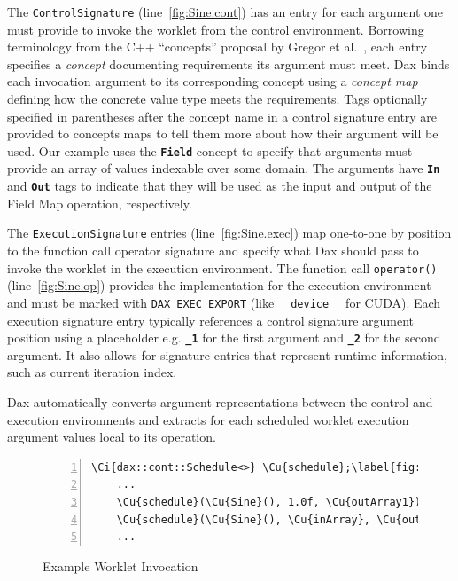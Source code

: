 \documentclass[conference]{IEEEtran}
\newcommand*{\scite}[1]{~\cite{#1}}
\newcommand{\etal}{et al.}
\newcommand{\Ci}[1]{{\textbf{#1}}} %
\newcommand{\Cu}[1]{{\color{gray}\textbf{#1}}} %
\newcommand{\Code}[1]{{\small\texttt{#1}}}
\begin{document}
The \Code{ControlSignature} (line~\ref{fig:Sine.cont}) has an entry
for each argument one must provide to invoke the worklet from the
control environment.
%
Borrowing terminology from the C++ ``concepts'' proposal by Gregor
\etal\scite{Gregor2006}, each entry specifies a \emph{concept}
documenting requirements its argument must meet.
%
Dax binds each invocation argument to its corresponding concept using
a \emph{concept map} defining how the concrete value type meets the
requirements.
%
Tags optionally specified in parentheses after the concept name in a
control signature entry are provided to concepts maps to tell them
more about how their argument will be used.
%
Our example uses the \Code{\Ci{Field}} concept to specify that
arguments must provide an array of values indexable over some domain.
%
The arguments have \Code{\Ci{In}} and \Code{\Ci{Out}} tags to indicate
that they will be used as the input and output of the Field Map
operation, respectively.

The \Code{ExecutionSignature} entries (line~\ref{fig:Sine.exec}) map
one-to-one by position to the function call operator signature and
specify what Dax should pass to invoke the worklet in the execution
environment.
%
The function call \Code{operator()} (line~\ref{fig:Sine.op}) provides
the implementation for the execution environment and must be marked
with \Code{DAX\_EXEC\_EXPORT} (like \Code{\_\_device\_\_} for CUDA).
%
Each execution signature entry typically references a control
signature argument position using a placeholder e.g. \Code{\Ci{\_1}}
for the first argument and \Code{\Ci{\_2}} for the second argument.
It also allows for signature entries that represent runtime information,
such as current iteration index.


Dax automatically converts argument representations between the
control and execution environments and extracts for each scheduled
worklet execution argument values local to its operation.
%
\begin{figure}[ht]\centering
  \begin{Verbatim}[commandchars=\\\{\}, gobble=4, frame=single,
                   fontfamily=tt, fontsize=\scriptsize,
                   numbers=left, numbersep=2pt]
    \Ci{dax::cont::Schedule<>} \Cu{schedule};\label{fig:InvokeSine.constructor}
    ...
    \Cu{schedule}(\Cu{Sine}(), 1.0f, \Cu{outArray1}); \label{fig:InvokeSine.constant}
    \Cu{schedule}(\Cu{Sine}(), \Cu{inArray}, \Cu{outArray2});  \label{fig:InvokeSine.array}
    ...
  \end{Verbatim}
  \caption{Example Worklet Invocation}\label{fig:InvokeSine}
\end{figure}
\end{document}

